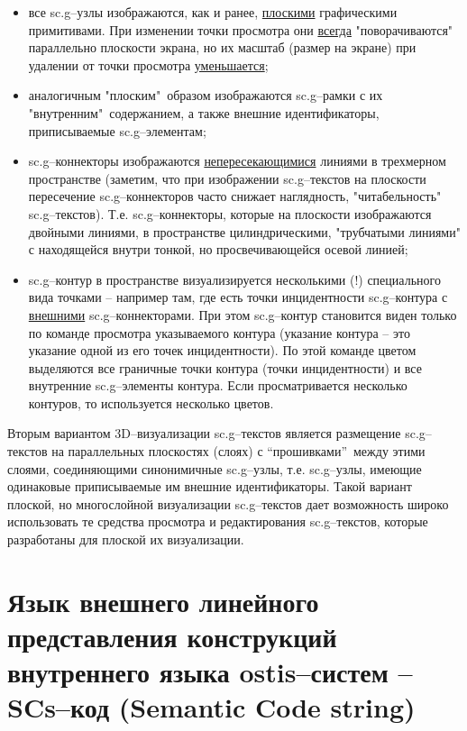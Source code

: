 \begin{itemize}
	\item все sc.g--узлы изображаются, как и ранее, \uline{плоскими} графическими примитивами. При изменении точки просмотра они \uline{всегда} "поворачиваются"{} параллельно плоскости экрана, но их масштаб (размер на экране) при удалении от  точки просмотра \uline{уменьшается};
	\item аналогичным "плоским"\ образом изображаются sc.g--рамки с их "внутренним"\ содержанием, а также внешние идентификаторы, приписываемые sc.g--элементам;
	\item sc.g--коннекторы изображаются \uline{непересекающимися} линиями в трехмерном пространстве (заметим, что при изображении sc.g--текстов на плоскости пересечение sc.g--коннекторов часто снижает наглядность, "читабельность"{} sc.g--текстов). Т.е. sc.g--коннекторы, которые на плоскости изображаются двойными линиями, в пространстве  цилиндрическими, "трубчатыми линиями"{} с находящейся внутри тонкой, но просвечивающейся осевой линией;
	\item sc.g--контур в пространстве визуализируется несколькими (!) специального вида точками -- например там, где есть точки инцидентности sc.g--контура с \uline{внешними} sc.g--коннекторами. При этом sc.g--контур становится виден только по команде просмотра указываемого контура (указание контура – это указание одной из его точек инцидентности). По этой команде цветом выделяются все граничные точки контура (точки инцидентности) и все внутренние sc.g--элементы контура. Если просматривается  несколько контуров, то используется несколько цветов.
\end{itemize}

Вторым вариантом 3D--визуализации sc.g--текстов является размещение sc.g--текстов на параллельных плоскостях (слоях) с “прошивками”\ между этими слоями, соединяющими синонимичные sc.g--узлы, т.е. sc.g--узлы, имеющие одинаковые приписываемые им внешние идентификаторы. Такой вариант плоской, но многослойной визуализации sc.g--текстов дает возможность широко использовать те средства просмотра и редактирования sc.g--текстов, которые разработаны для плоской их визуализации.


\section{Язык внешнего линейного представления конструкций внутреннего языка ostis--систем -- SCs--код (Semantic Code string)}
\label{sec_scs}


\begin{SCn}
\end{SCn}

